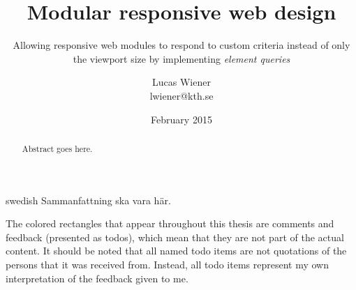 \documentclass[a4paper,11pt]{kth-mag}
\title{Modular responsive web design}
\subtitle{Allowing responsive web modules to respond to custom criteria instead of only the viewport size by implementing \emph{element queries}}
\author{Lucas Wiener \\ \lowercase{lwiener@kth.se}}
\date{February 2015}
\begin{document}
  \frontmatter
  \pagestyle{empty}
  \removepagenumbers
  \maketitle
  \begin{abstract}
    Abstract goes here.
  \end{abstract}
  \clearpage
  \begin{foreignabstract}{swedish}
    Sammanfattning ska vara här.
  \end{foreignabstract}
  \clearpage
  \noindent
  \large
  The colored rectangles that appear throughout this thesis are comments and feedback (presented as todos), which mean that they are not part of the actual content.
  It should be noted that all named todo items are not quotations of the persons that it was received from.
  Instead, all todo items represent my own interpretation of the feedback given to me.
  \clearpage
  \tableofcontents*
  \listoftodos
  \mainmatter
  \pagestyle{newchap}
\end{document}
